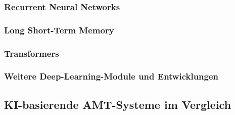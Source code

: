 \subsubsection{Recurrent Neural Networks}

\subsubsection{Long Short-Term Memory}

\subsubsection{Transformers}

\subsubsection{Weitere Deep-Learning-Module und Entwicklungen}


\subsection{KI-basierende AMT-Systeme im Vergleich}
